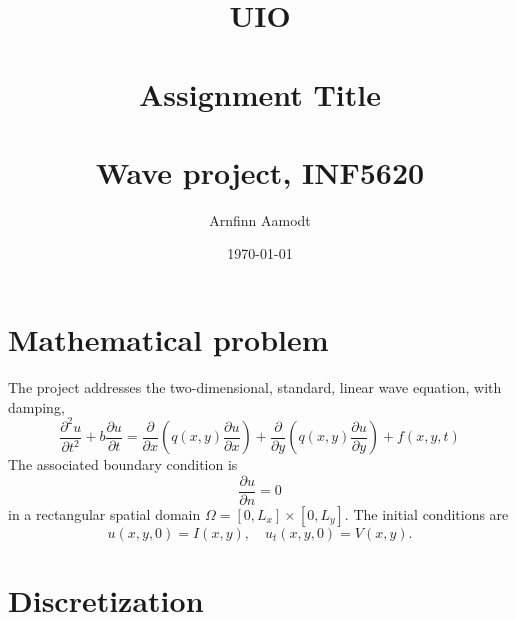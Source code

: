 \documentclass[paper=a4, fontsize=11pt]{article} %
\title{	
\normalfont \normalsize 
\textsc{UIO} \\ [25pt] %
\horrule{0.5pt} \\[0.4cm] %
\huge Assignment Title \\ %
\horrule{2pt} \\[0.5cm] %
}
\author{Arnfinn Aamodt} %
\date{\normalsize\today} %
\newcommand{\p}{\partial}
\begin{document}
\title{Wave project, INF5620}
\maketitle

\section{Mathematical problem}

The project addresses the two-dimensional, standard, linear wave equation, with damping,
\[
\frac{\p^2 u}{\p t^2}+b\frac{\p u}{\p t} = 
	\frac{\p}{\p x}\left(q(x,y)\frac{\p u}{\p x}\right)+
	\frac{\p}{\p y}\left(q(x,y)\frac{\p u}{\p y}\right)+f(x,y,t)
\]
The associated boundary condition is
\[
\frac{\p u}{\p n}=0
\]
in a rectangular spatial domain $\Omega=[0,L_x]\times[0,L_y]$. The initial conditions are
\[
u(x,y,0)=I(x,y),\quad u_t(x,y,0)=V(x,y).
\]

\section{Discretization}
\end{document}
